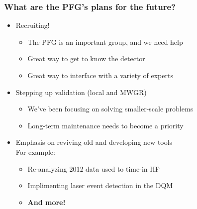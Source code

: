 \documentclass[bigger]{beamer}
\providecommand{\alert}[1]{\textbf{#1}}
\begin{document}
\begin{frame}
\frametitle{What are the PFG's plans for the future?}
\label{sec-1-1-5}
\begin{itemize}

\item Recruiting!
\label{sec-1-1-5-1}%
\begin{itemize}

\item The PFG is an important group, and we need help
\label{sec-1-1-5-1-1}%

\item Great way to get to know the detector
\label{sec-1-1-5-1-2}%

\item Great way to interface with a variety of experts
\label{sec-1-1-5-1-3}%
\end{itemize} %

\item Stepping up validation (local and MWGR)
\label{sec-1-1-5-2}%
\begin{itemize}

\item We've been focusing on solving smaller-scale problems
\label{sec-1-1-5-2-1}%

\item Long-term maintenance needs to become a priority
\label{sec-1-1-5-2-2}%
\end{itemize} %

\item Emphasis on reviving old and developing new tools\\
\label{sec-1-1-5-3}%
For example:
\begin{itemize}

\item Re-analyzing 2012 data used to time-in HF
\label{sec-1-1-5-3-1}%

\item Implimenting laser event detection in the DQM
\label{sec-1-1-5-3-2}%

\item \alert{And more!}
\label{sec-1-1-5-3-3}%
\end{itemize} %
\end{itemize} %
\end{frame}
\end{document}
